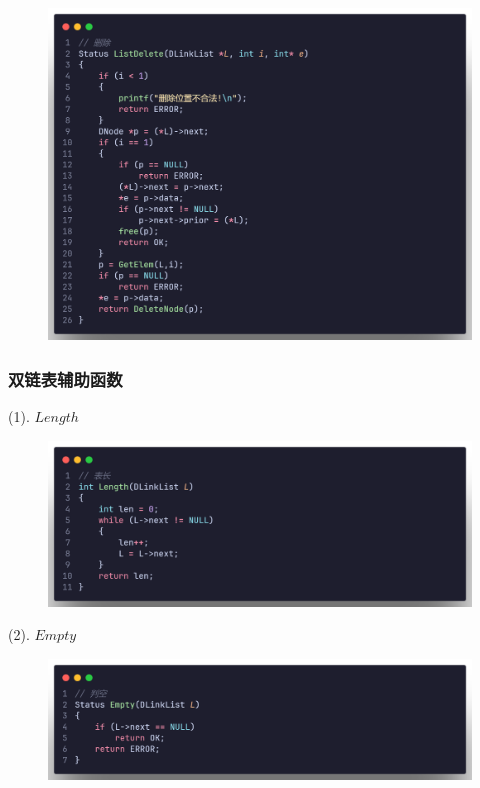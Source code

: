 \begin{figure}[H]
    \centering
    \includegraphics[scale=0.2]{"figure/Note/LinearList/DlDel.png"}
\end{figure}

\subsubsection{双链表辅助函数}

(1). $Length$

\begin{figure}[H]
    \centering
    \includegraphics[scale=0.2]{"figure/Note/LinearList/DlLen.png"}
\end{figure}

(2). $Empty$

\begin{figure}[H]
    \centering
    \includegraphics[scale=0.2]{"figure/Note/LinearList/DlEmpty.png"}
\end{figure}

